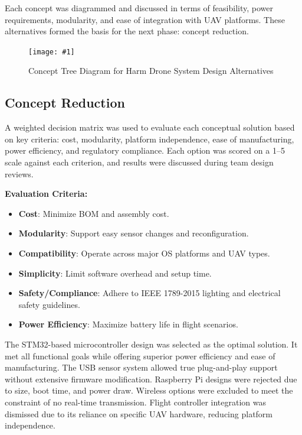 \documentclass[12pt]{article}
\newcommand{\quickfigure}[4]{%
\begin{figure}[!htbp]
\centering
\texttt{[image: \#1]}
\caption{#3}
\label{#4}
\end{figure}%
}
\begin{document}
Each concept was diagrammed and discussed in terms of feasibility, power requirements, modularity, and ease of integration with UAV platforms. These alternatives formed the basis for the next phase: concept reduction.

\quickfigure{images/concept-generation.png}{15cm}{Concept Tree Diagram for Harm Drone System Design Alternatives
}{concept-generation}

\newpage 

\subsection{Concept Reduction}
A weighted decision matrix was used to evaluate each conceptual solution based on key criteria: cost, modularity, platform independence, ease of manufacturing, power efficiency, and regulatory compliance. Each option was scored on a 1–5 scale against each criterion, and results were discussed during team design reviews.

\textbf{Evaluation Criteria:}
\begin{itemize}
    \item \textbf{Cost}: Minimize BOM and assembly cost.
    \item \textbf{Modularity}: Support easy sensor changes and reconfiguration.
    \item \textbf{Compatibility}: Operate across major OS platforms and UAV types.
    \item \textbf{Simplicity}: Limit software overhead and setup time.
    \item \textbf{Safety/Compliance}: Adhere to IEEE 1789-2015 lighting and electrical safety guidelines.
    \item \textbf{Power Efficiency}: Maximize battery life in flight scenarios.
\end{itemize}

The STM32-based microcontroller design was selected as the optimal solution. It met all functional goals while offering superior power efficiency and ease of manufacturing. The USB sensor system allowed true plug-and-play support without extensive firmware modification. Raspberry Pi designs were rejected due to size, boot time, and power draw. Wireless options were excluded to meet the constraint of no real-time transmission. Flight controller integration was dismissed due to its reliance on specific UAV hardware, reducing platform independence.
\end{document}

